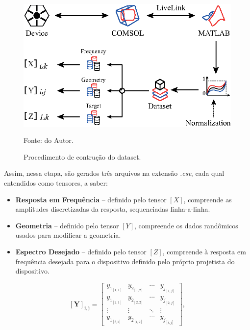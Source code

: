 \begin{figure}[H]
    \centering
    \includegraphics{04-Figuras/DatasetBuilding.eps}
    \caption{Procedimento de contrução do dataset.} \par
    Fonte: do Autor.
    \label{figura: DatasetBuilding}
\end{figure}

Assim, nessa etapa, são gerados três arquivos na extensão \textit{.csv}, cada qual entendidos como tensores, a saber:

\begin{itemize}
	\item \textbf{Resposta em Frequência} -- definido pelo tensor $[X]$, compreende as amplitudes discretizadas da resposta, sequenciadas linha-a-linha.
	\item \textbf{Geometria} -- definido pelo tensor $[Y]$, compreende os dados randômicos usados para modificar a geometria.
	\item \textbf{Espectro Desejado} -- definido pelo tensor $[Z]$, compreende à resposta em frequência desejada para o dispositivo definido pelo próprio projetista do dispositivo.
\end{itemize}









\begin{equation}
\label{eq:tensorY}
\mathbf{[Y]_{i,j}} =
\begin{bmatrix}
y_{1_{[1,1]}} & y_{2_{[1,2]}} & \cdots & y_{j_{[1,j]}}\\
y_{1_{[2,1]}} & y_{2_{[2,2]}} & \cdots & y_{j_{[2,j]}}\\
\vdots  & \vdots  & \ddots & \vdots\\
y_{1_{[i,1]}} & y_{2_{[i,2]}} & \cdots & y_{j_{[i,j]}}
\end{bmatrix},
\end{equation}

